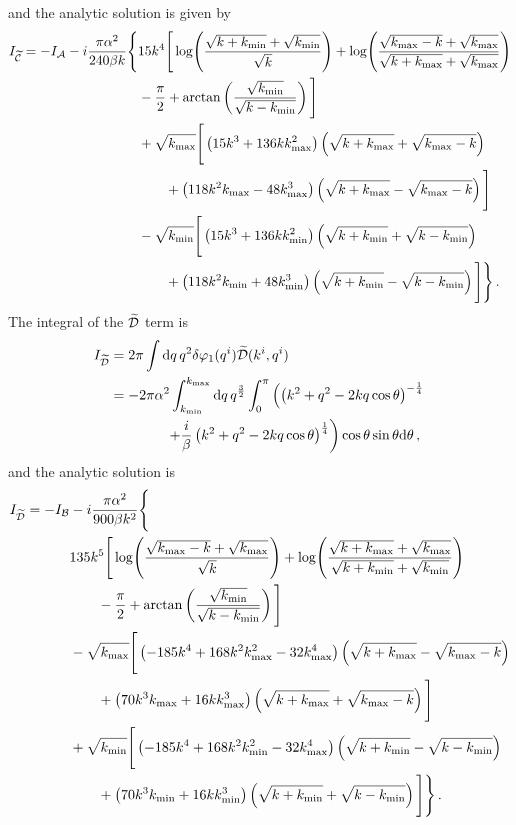 % 
and the analytic solution is given by
% 
\begin{align}
\label{eq:cint-soln-num}
I_{\wt{\C}} = -I_\A -i\frac{\pi\alpha^2}{240 \beta k}\Bigg\{ 
	&15 k^4 \Bigg[ \log\Biggl(\frac{\sqrt{k+\kmin} + \sqrt{\kmin}}{\sqrt{k}}
			    \Biggr)
	 + \log\Biggl( \frac{\sqrt{\kmax-k} + \sqrt{\kmax}}{\sqrt{k+\kmax}
			+\sqrt{\kmax}}\Biggr) \nonumber \\
	&-\frac{\pi}{2} + \arctan\left( \frac{\sqrt{\kmin}}{\sqrt{k-\kmin}}\right)
	\Bigg] \nonumber\\
% 
        &+\sqrt{\kmax}\Bigg[ \left(15k^3 + 136k\kmax^2 \right)\left(\sqrt{k+\kmax} +
	  \sqrt{\kmax-k}\right) \nonumber \\
	&\qquad +\left(118k^2\kmax -48\kmax^3\right) \left(\sqrt{k+\kmax} -
         \sqrt{\kmax -k} \right) \Bigg] \nonumber \\
% 
	&-\sqrt{\kmin}\Bigg[ \left(15k^3 + 136k\kmin^2 \right)\left(\sqrt{k+\kmin} +
	  \sqrt{k-\kmin}\right) \nonumber \\
	&\qquad +\left(118k^2\kmin +48\kmin^3\right) \left(\sqrt{k+\kmin} -
         \sqrt{k-\kmin} \right) \Bigg] \Bigg\} \,.
\end{align}
The integral of the $\widetilde{\mathcal{D}}$ term is 
% 
\begin{align}
 \label{eq:dint-num}
I_{\wt{\D}} &= 2\pi \int \d q\, q^2 \dvp1(\qvi) \wt{\D}(\kvi, \qvi) \\
% 
 &= -2\pi\alpha^2 \int_{\kmin}^{\kmax} \d q\, q^{\frac{3}{2}} \int_0^\pi 
     \left( \left(k^2 + q^2 -2kq \cos\theta\right)^{-\frac{1}{4}} \right.\nonumber\\
% 
        &\qquad\qquad\left.+\frac{i}{\beta}\left(k^2 + q^2 -2kq
\cos\theta\right)^{\frac{1}{4}}
	\right) \cos\theta\sin\theta \d \theta\,,
\end{align}
% 
and the analytic solution is
% 
\begin{align}
\label{eq:dint-soln-num}
I_{\wt{\D}} = -I_\B &-i\frac{\pi\alpha^2}{900\beta k^2}\Bigg\{ \nonumber \\
	&135 k^5 \Bigg[ \log\Biggl(\frac{\sqrt{\kmax-k} + \sqrt{\kmax}}{\sqrt{k}}
			    \Biggr)
	 + \log\Biggl( \frac{\sqrt{k+\kmax} +\sqrt{\kmax}}{\sqrt{k+\kmin} +
			  \sqrt{\kmin}}\Biggr) \nonumber \\
	&\qquad -\frac{\pi}{2} + \arctan\left(
\frac{\sqrt{\kmin}}{\sqrt{k-\kmin}}\right)
	\Bigg] \nonumber\\
% 
        &-\sqrt{\kmax}\Bigg[ \left(-185k^4 + 168k^2\kmax^2-32\kmax^4
	    \right)\left(\sqrt{k+\kmax} - \sqrt{\kmax-k}\right) \nonumber \\
	&\qquad +\left(70k^3\kmax +16k\kmax^3\right) \left(\sqrt{k+\kmax} +
         \sqrt{\kmax -k} \right) \Bigg] \nonumber \\
% 
	&+\sqrt{\kmin}\Bigg[ \left(-185k^4 + 168k^2\kmin^2 -32\kmax^4
	    \right)\left(\sqrt{k+\kmin} - \sqrt{k-\kmin}\right) \nonumber \\
	&\qquad +\left(70k^3\kmin +16k\kmin^3\right) \left(\sqrt{k+\kmin} +
         \sqrt{k-\kmin} \right) \Bigg] \Bigg\} \,.
\end{align}
